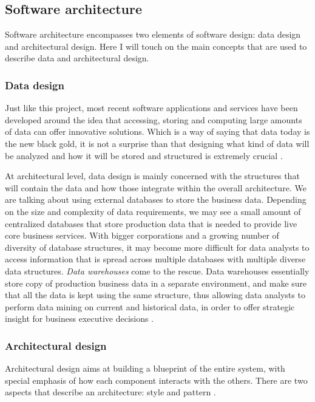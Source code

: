 \subsection{Software architecture}
Software architecture encompasses two elements of software design: data design
and architectural design. Here I will touch on the main concepts that are used
to describe data and architectural design.

\subsubsection{Data design}
Just like this project, most recent software applications and services have been
developed around the idea that accessing, storing and computing large amounts of
data can offer innovative solutions. Which is a way of saying that data today is
the new black gold, it is not a surprise than that designing what kind of data
will be analyzed and how it will be stored and structured is extremely crucial
\cite{RP05}.

At architectural level, data design is mainly concerned with the structures that
will contain the data and how those integrate within the overall architecture.
We are talking about using external databases to store the business data.
Depending on the size and complexity of data requirements, we may see a small
amount of centralized databases that store production data that is needed to
provide live core business services. With bigger corporations and a growing
number of diversity of database structures, it may become more difficult for
data analysts to access information that is spread across multiple databases
with multiple diverse data structures. \emph{Data warehouses} come to the
rescue. Data warehouses essentially store copy of production business data in a
separate environment, and make sure that all the data is kept using the same
structure, thus allowing data analysts to perform data mining on current and
historical data, in order to offer strategic insight for business
executive decisions \cite{RM96}.

\subsubsection{Architectural design}
Architectural design aims at building a blueprint of the entire system, with
special emphasis of how each component interacts with the others. There are two
aspects that describe an architecture: style and pattern \cite{RP05}.


